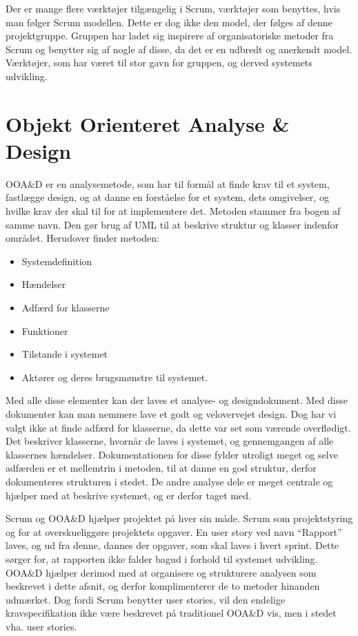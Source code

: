Der er mange flere værktøjer tilgængelig i Scrum, værktøjer som benyttes, hvis man følger Scrum modellen.
Dette er dog ikke den model, der følges af denne projektgruppe.
Gruppen har ladet sig inspirere af organisatoriske metoder fra Scrum og benytter sig af nogle af disse, da det er en udbredt og anerkendt model.
Værktøjer, som har været til stor gavn for gruppen, og derved systemets udvikling.

\section{Objekt Orienteret Analyse \& Design}
OOA\&D er en analysemetode, som har til formål at finde krav til et system, fastlægge design, og at danne en forståelse for et system, dets omgivelser, og hvilke krav der skal til for at implementere det.
Metoden stammer fra bogen af samme navn.\citep{OOA&D2001}
Den gør brug af UML til at beskrive struktur og klasser indenfor området.
Herudover finder metoden:

\begin{itemize}
\item Systemdefinition
\item Hændelser
\item Adfærd for klasserne
\item Funktioner
\item Tilstande i systemet
\item Aktører og deres brugsmønstre til systemet.
\end{itemize}

Med alle disse elementer kan der laves et analyse- og designdokument.
Med disse dokumenter kan man nemmere lave et godt og velovervejet design.
Dog har vi valgt ikke at finde adfærd for klasserne, da dette var set som værende overflødigt.
Det beskriver klasserne, hvornår de laves i systemet, og gennemgangen af alle klassernes hændelser. 
Dokumentationen for disse fylder utroligt meget og selve adfærden er et mellemtrin i metoden, til at danne en god struktur, derfor dokumenteres strukturen i stedet.
De andre analyse dele er meget centrale og hjælper med at beskrive systemet, og er derfor taget med. 


Scrum og OOA\&D hjælper projektet på hver sin måde.
Scrum som projektstyring og for at overskueliggøre projektets opgaver. 
En user story ved navn ``Rapport'' laves, og ud fra denne, dannes der opgaver, som skal laves i hvert sprint. 
Dette sørger for, at rapporten ikke falder bagud i forhold til systemet udvikling.
OOA\&D hjælper derimod med at organisere og strukturere analysen som beskrevet i dette afsnit, og derfor komplimenterer de to metoder hinanden udmærket.
Dog fordi Scrum benytter user stories, vil den endelige kravspecifikation ikke være beskrevet på traditionel OOA\&D vis, men i stedet vha. user stories.









